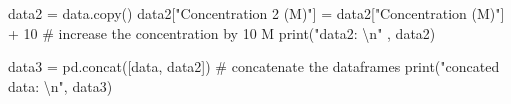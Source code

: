 \documentclass[
  letterpaper,
  DIV=11,
  numbers=noendperiod]{scrreprt}
\newenvironment{Shaded}{\begin{snugshade}}{\end{snugshade}}
\newcommand{\BuiltInTok}[1]{\textcolor[rgb]{0.00,0.23,0.31}{#1}}
\newcommand{\CharTok}[1]{\textcolor[rgb]{0.13,0.47,0.30}{#1}}
\newcommand{\CommentTok}[1]{\textcolor[rgb]{0.37,0.37,0.37}{#1}}
\newcommand{\DecValTok}[1]{\textcolor[rgb]{0.68,0.00,0.00}{#1}}
\newcommand{\NormalTok}[1]{\textcolor[rgb]{0.00,0.23,0.31}{#1}}
\newcommand{\OperatorTok}[1]{\textcolor[rgb]{0.37,0.37,0.37}{#1}}
\newcommand{\StringTok}[1]{\textcolor[rgb]{0.13,0.47,0.30}{#1}}
\begin{document}
\begin{Shaded}
\begin{Highlighting}[]
\NormalTok{data2 }\OperatorTok{=}\NormalTok{ data.copy()}
\NormalTok{data2[}\StringTok{"Concentration 2 (M)"}\NormalTok{] }\OperatorTok{=}\NormalTok{ data2[}\StringTok{"Concentration (M)"}\NormalTok{] }\OperatorTok{+} \DecValTok{10} \CommentTok{\# increase the concentration by 10 M}
\BuiltInTok{print}\NormalTok{(}\StringTok{"data2: }\CharTok{\textbackslash{}n}\StringTok{"}\NormalTok{ , data2)}


\NormalTok{data3 }\OperatorTok{=}\NormalTok{ pd.concat([data, data2]) }\CommentTok{\# concatenate the dataframes}
\BuiltInTok{print}\NormalTok{(}\StringTok{"concated data: }\CharTok{\textbackslash{}n}\StringTok{"}\NormalTok{, data3)}
\end{Highlighting}
\end{Shaded}
\end{document}
